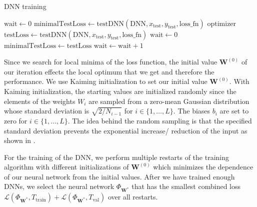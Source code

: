 \begin{algorithm}[H]%
\caption{\label{trainDNN}DNN training}
\begin{algorithmic}[1]
\State $\mathrm{wait} \gets 0$
\State $\mathrm{minimalTestLoss} \gets \mathrm{testDNN}(\mathrm{DNN}, x_\mathrm{test}, y_\mathrm{test}, \mathrm{loss\_fn})$
\State {}%
\State {}$\mathrm{optimizer}$
\State $\mathrm{testLoss} \gets \mathrm{testDNN}(\mathrm{DNN}, x_\mathrm{test}, y_\mathrm{test}, \mathrm{loss\_fn})$
\State $\mathrm{wait} \gets 0$
\State $\mathrm{minimalTestLoss} \gets \mathrm{testLoss}$
\State {}%
\Else
\State $\mathrm{wait} \gets \mathrm{wait}+1$
\EndIf
{}
\State {}%
\State \Return
\EndIf
\EndFor
\EndProcedure
\end{algorithmic}
\end{algorithm}

Since we search for local minima of the loss function, the initial value $\mathbf{W}^{(0)}$ of our iteration effects the local optimum that we get and therefore the performance. We use Kaiming initialization \cite{7410480} to set our initial value $\mathbf{W}^{(0)}$. With Kaiming initialization, the starting values are initialized randomly since the elements of the weights $W_i$ are sampled from a zero-mean Gaussian distribution whose standard deviation is $\sqrt{2/N_{i-1}}$ for $i\in\{1,\dotsc,L\}$. The biases $b_i$ are set to zero for $i\in\{1,\dotsc,L\}$. The idea behind the random sampling is that the specified standard deviation prevents the exponential increase/ reduction of the input as shown in \cite{7410480}.

For the training of the DNN, we perform multiple restarts of the training algorithm with different initializations of $\mathbf{W}^{(0)}$ which minimizes the dependence of our neural network from the initial values. After we have trained enough DNNs, we select the neural network $\Phi_{\mathbf{W}^*}$ that has the smallest combined loss $\mathscr{L}(\Phi_{\mathbf{W}^*},T_\mathrm{train})+\mathscr{L}(\Phi_{\mathbf{W}^*},T_\mathrm{val})$ over all restarts.

